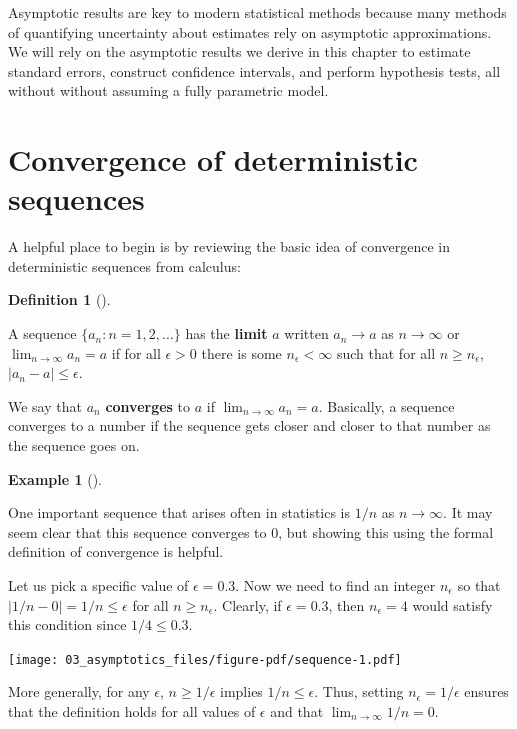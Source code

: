 \documentclass[
  letterpaper,
  DIV=11,
  numbers=noendperiod]{scrreprt}
\theoremstyle{definition}
\newtheorem{example}{Example}[chapter]
\theoremstyle{definition}
\newtheorem{definition}{Definition}[chapter]
\theoremstyle{plain}
\theoremstyle{remark}
\begin{document}
Asymptotic results are key to modern statistical methods because many
methods of quantifying uncertainty about estimates rely on asymptotic
approximations. We will rely on the asymptotic results we derive in this
chapter to estimate standard errors, construct confidence intervals, and
perform hypothesis tests, all without without assuming a fully
parametric model.

\hypertarget{convergence-of-deterministic-sequences}{%
\section{Convergence of deterministic
sequences}\label{convergence-of-deterministic-sequences}}

A helpful place to begin is by reviewing the basic idea of convergence
in deterministic sequences from calculus:

\begin{definition}[]\protect\hypertarget{def-limit}{}\label{def-limit}

A sequence \(\{a_n: n = 1, 2, \ldots\}\) has the \textbf{limit} \(a\)
written \(a_n \rightarrow a\) as \(n\rightarrow \infty\) or
\(\lim_{n\rightarrow \infty} a_n = a\) if for all \(\epsilon > 0\) there
is some \(n_{\epsilon} < \infty\) such that for all
\(n \geq n_{\epsilon}\), \(|a_n - a| \leq \epsilon\).

\end{definition}

We say that \(a_n\) \textbf{converges} to \(a\) if
\(\lim_{n\rightarrow\infty} a_n = a\). Basically, a sequence converges
to a number if the sequence gets closer and closer to that number as the
sequence goes on.

\begin{example}[]\protect\hypertarget{exm-limit}{}\label{exm-limit}

One important sequence that arises often in statistics is \(1/n\) as
\(n\to\infty\). It may seem clear that this sequence converges to 0, but
showing this using the formal definition of convergence is helpful.

Let us pick a specific value of \(\epsilon = 0.3\). Now we need to find
an integer \(n_{\epsilon}\) so that \(|1/n - 0| = 1/n \leq \epsilon\)
for all \(n \geq n_{\epsilon}\). Clearly, if \(\epsilon = 0.3\), then
\(n_{\epsilon} = 4\) would satisfy this condition since
\(1/4 \leq 0.3\).

\texttt{[image: 03\_asymptotics\_files/figure-pdf/sequence-1.pdf]}

More generally, for any \(\epsilon\), \(n \geq 1/\epsilon\) implies
\(1/n \leq \epsilon\). Thus, setting \(n_{\epsilon} = 1/\epsilon\)
ensures that the definition holds for all values of \(\epsilon\) and
that \(\lim_{n\to\infty} 1/n = 0\).

\end{example}
\end{document}
